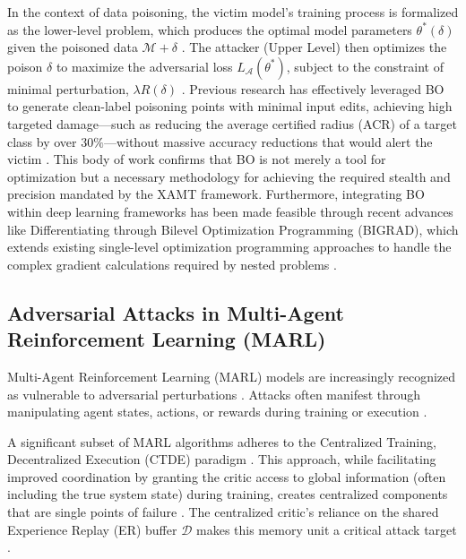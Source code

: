 \documentclass[conference]{IEEEtran}
\begin{document}
In the context of data poisoning, the victim model's training process is formalized as the lower-level problem, which produces the optimal model parameters $\theta^*(\delta)$ given the poisoned data $\mathcal{M}+\delta$ \cite{Ref18}. The attacker (Upper Level) then optimizes the poison $\delta$ to maximize the adversarial loss $L_{\mathcal{A}}(\theta^*)$, subject to the constraint of minimal perturbation, $\lambda R(\delta)$ \cite{Ref24}. Previous research has effectively leveraged BO to generate clean-label poisoning points with minimal input edits, achieving high targeted damage—such as reducing the average certified radius (ACR) of a target class by over $30\%$—without massive accuracy reductions that would alert the victim \cite{Ref19, Ref20}. This body of work confirms that BO is not merely a tool for optimization but a necessary methodology for achieving the required stealth and precision mandated by the XAMT framework. Furthermore, integrating BO within deep learning frameworks has been made feasible through recent advances like Differentiating through Bilevel Optimization Programming (BIGRAD), which extends existing single-level optimization programming approaches to handle the complex gradient calculations required by nested problems \cite{Ref23}.

\subsection{Adversarial Attacks in Multi-Agent Reinforcement Learning (MARL)}
Multi-Agent Reinforcement Learning (MARL) models are increasingly recognized as vulnerable to adversarial perturbations \cite{Ref26}. Attacks often manifest through manipulating agent states, actions, or rewards during training or execution \cite{Ref3, Ref27}.

A significant subset of MARL algorithms adheres to the Centralized Training, Decentralized Execution (CTDE) paradigm \cite{Ref6, Ref10}. This approach, while facilitating improved coordination by granting the critic access to global information (often including the true system state) during training, creates centralized components that are single points of failure \cite{Ref6}. The centralized critic's reliance on the shared Experience Replay (ER) buffer $\mathcal{D}$ makes this memory unit a critical attack target \cite{Ref11}.
\end{document}
